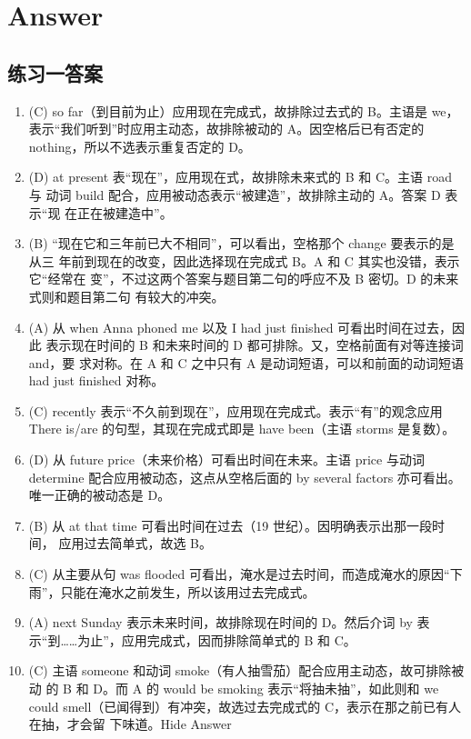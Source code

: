 \section{Answer}

\subsection{练习一答案}

\begin{enumerate}
\item (C) so far（到目前为止）应用现在完成式，故排除过去式的 B。主语是 we，表示“我们听到”时应用主动态，故排除被动的 A。因空格后已有否定的 nothing，所以不选表示重复否定的 D。

\item (D) at present 表“现在”，应用现在式，故排除未来式的 B 和 C。主语 road 与
  动词 build 配合，应用被动态表示“被建造”，故排除主动的 A。答案 D 表示“现
  在正在被建造中”。

\item (B) “现在它和三年前已大不相同”，可以看出，空格那个 change 要表示的是从三
  年前到现在的改变，因此选择现在完成式 B。A 和 C 其实也没错，表示它“经常在
  变”，不过这两个答案与题目第二句的呼应不及 B 密切。D 的未来式则和题目第二句
  有较大的冲突。

\item (A) 从 when Anna phoned me 以及 I had just finished 可看出时间在过去，因此
  表示现在时间的 B 和未来时间的 D 都可排除。又，空格前面有对等连接词 and，要
  求对称。在 A 和 C 之中只有 A 是动词短语，可以和前面的动词短语 had just
  finished 对称。

\item (C) recently 表示“不久前到现在”，应用现在完成式。表示“有”的观念应用 There is/are 的句型，其现在完成式即是 have been（主语 storms 是复数）。

\item (D) 从 future price（未来价格）可看出时间在未来。主语 price 与动词 determine 配合应用被动态，这点从空格后面的 by several factors 亦可看出。唯一正确的被动态是 D。

\item (B) 从 at that time 可看出时间在过去（19 世纪）。因明确表示出那一段时间，
  应用过去简单式，故选 B。

\item (C) 从主要从句 was flooded 可看出，淹水是过去时间，而造成淹水的原因“下雨”，只能在淹水之前发生，所以该用过去完成式。

\item (A) next Sunday 表示未来时间，故排除现在时间的 D。然后介词 by 表示“到……为止”，应用完成式，因而排除简单式的 B 和 C。

\item (C) 主语 someone 和动词 smoke（有人抽雪茄）配合应用主动态，故可排除被动
  的 B 和 D。而 A 的 would be smoking 表示“将抽未抽”，如此则和 we could
  smell（已闻得到）有冲突，故选过去完成式的 C，表示在那之前已有人在抽，才会留
  下味道。Hide Answer

\end{enumerate}

